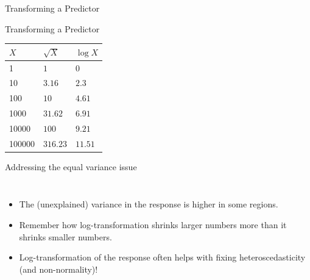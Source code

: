 \documentclass{beamer}\usepackage[]{graphicx}\usepackage[]{color}
\makeatletter
\newcommand{\hlopt}[1]{\textcolor[rgb]{1,0.894,0.769}{#1}}%
\newcommand{\hlstd}[1]{\textcolor[rgb]{1,0.894,0.769}{#1}}%
\newcommand{\hlkwb}[1]{\textcolor[rgb]{0.804,0.776,0.451}{#1}}%
\newcommand{\hlkwc}[1]{\textcolor[rgb]{0.78,0.941,0.545}{#1}}%
\newcommand{\hlkwd}[1]{\textcolor[rgb]{1,0.78,0.769}{#1}}%
\newenvironment{kframe}{%
 \def\at@end@of@kframe{}%
 \ifinner\ifhmode%
  \def\at@end@of@kframe{\end{minipage}}%
  \begin{minipage}{\columnwidth}%
 \fi\fi%
 \def\FrameCommand##1{\hskip\@totalleftmargin \hskip-\fboxsep
 \colorbox{shadecolor}{##1}\hskip-\fboxsep
     \hskip-\linewidth \hskip-\@totalleftmargin \hskip\columnwidth}%
 \MakeFramed {\advance\hsize-\width
   \@totalleftmargin\z@ \linewidth\hsize
   \@setminipage}}%
 {\par\unskip\endMakeFramed%
 \at@end@of@kframe}
\newenvironment{knitrout}{}{} %
\makeatother
\begin{document}
\begin{darkframes}
\begin{frame}[fragile]{Transforming a Predictor}
      \lc
    
    \end{frame}
    
    \begin{frame}{Transforming a Predictor}

      \begin{center}
        \begin{tabular}{lll}
          \hline
          $X$ & $\sqrt{X}$ & $\log X$ \\
          \hline
          1 & $1$ & $0$ \\
          10 & $3.16$ & $2.3$ \\
          100 & $10$ & $4.61$ \\
          1000 & $31.62$ & $6.91$ \\
          10000 & $100$ & $9.21$ \\
          100000 & $316.23$ & $11.51$ \\
          \hline
        \end{tabular}
      \end{center}
    \end{frame}
    
    
    \begin{frame}[fragile]{Addressing the equal variance issue}
      \begin{columns}[onlytextwidth]
          \begin{itemize}[<+->]
            \item The (unexplained) variance in the response is higher in some regions.
            \item Remember how log-transformation shrinks larger numbers more than it shrinks smaller numbers.
            \item Log-transformation of the response often helps with fixing heteroscedasticity (and non-normality)!
          \end{itemize}
\begin{knitrout}


\end{knitrout}
      \end{columns}
    \end{frame}
  
  
  
\end{darkframes}
\end{document}
